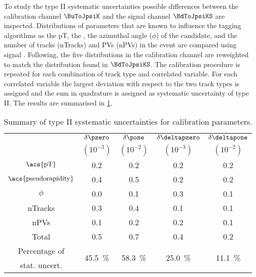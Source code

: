 To study the type II systematic uncertainties possible differences between the
calibration channel $\BuToJpsiK$ and the signal channel $\BdToJpsiKS$ are
inspected. Distributions of parameters that are known to influence the tagging
algorithms as the \acf{pT}, the \pseudorapidity, the azimuthal angle ($\phi$) of
the \Bmeson candidate, and the number of tracks (nTracks) and \aclp{PV}
(n\acsp{PV}) in the event are compared using signal \sweights. Following, the
five distributions in the calibration channel are reweighted to match the
distribution found in $\BdToJpsiKS$. The calibration procedure is repeated for
each combination of track type and correlated variable. For each correlated
variable the largest deviation with respect to the two track types is assigned
and the sum in quadrature is assigned as systematic uncertainty of type II. The
results are summarised in
\cref{tab:flavour_tagging:calibration:os:systematics}.
%
\begin{table}
  \centering
  \caption{Summary of type II systematic uncertainties for \OS calibration parameters.}
  \label{tab:flavour_tagging:calibration:os:systematics}
  \begin{tabular}{ccccc}
    \toprule
      & $\delta\pzero$ & $\delta\pone$ & $\delta\deltapzero$ & $\delta\deltapone$ \\
      & $(10^{-3})$    & $(10^{-2})$   & $(10^{-3})$         & $(10^{-2})$        \\
    \midrule
    $\text{\acs{pT}}$             & 0.2 & 0.2 & 0.2 & 0.2 \\
    $\text{\acs{pseudorapidity}}$ & 0.4 & 0.5 & 0.2 & 0.2 \\
    $\phi$                        & 0.0 & 0.1 & 0.3 & 0.1 \\
    nTracks                       & 0.3 & 0.4 & 0.1 & 0.1 \\
    nPVs                          & 0.1 & 0.2 & 0.2 & 0.1 \\
    \midrule
      Total                       & 0.5 & 0.7 & 0.4 & 0.2 \\
    \midrule
    Percentage of & 
    \multirow{2}[2]{*}{\SI{45.5}{\percent}} & 
    \multirow{2}[2]{*}{\SI{58.3}{\percent}} & 
    \multirow{2}[2]{*}{\SI{25.0}{\percent}} & 
    \multirow{2}[2]{*}{\SI{11.1}{\percent}} \\
    stat. uncert. \\
    \bottomrule
  \end{tabular}
\end{table}
%
